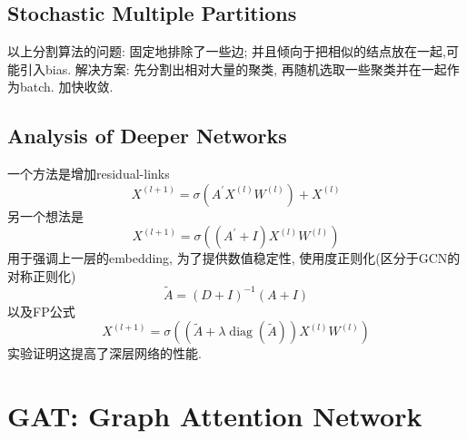 \documentclass{article}
\begin{document}
\subsection{Stochastic Multiple Partitions}

    以上分割算法的问题: 固定地排除了一些边; 并且倾向于把相似的结点放在一起,可能引入bias. 解决方案: 先分割出相对大量的聚类, 再随机选取一些聚类并在一起作为batch. 加快收敛.


\subsection{Analysis of Deeper Networks}

    一个方法是增加residual-links
    \begin{equation}
        X^{(l+1)}=\sigma\left(A^{\prime} X^{(l)} W^{(l)}\right)+X^{(l)}
    \end{equation}
    另一个想法是
    \begin{equation}
        X^{(l+1)}=\sigma\left(\left(A^{\prime}+I\right) X^{(l)} W^{(l)}\right)
    \end{equation}
    用于强调上一层的embedding, 为了提供数值稳定性, 使用度正则化(区分于GCN的对称正则化)
    \begin{equation}
        \tilde{A}=(D+I)^{-1}(A+I)
    \end{equation}
    以及FP公式
    \begin{equation}
        X^{(l+1)}=\sigma\left((\tilde{A}+\lambda \operatorname{diag}(\tilde{A})) X^{(l)} W^{(l)}\right)
    \end{equation}
    实验证明这提高了深层网络的性能.

\section{GAT: Graph Attention Network}
\end{document}
